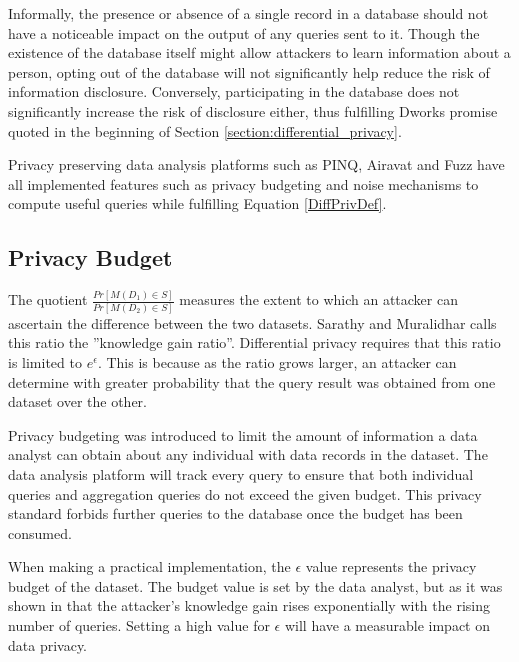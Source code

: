 Informally, the presence or absence of a single record in a database should not have a noticeable impact on the output of any queries sent to it. Though the existence of the database itself might allow attackers to learn information about a person, opting out of the database will not significantly help reduce the risk of information disclosure. Conversely, participating in the database does not significantly increase the risk of disclosure either, thus fulfilling Dworks promise quoted in the beginning of Section \ref{section:differential_privacy}.

Privacy preserving data analysis platforms such as PINQ\cite{mcsherry2009PINQ}, Airavat\cite{roy2010airavat} and Fuzz\cite{Haeberlen2011fuzz} have all implemented features such as privacy budgeting and noise mechanisms to compute useful queries while fulfilling Equation \ref{DiffPrivDef}.

\subsection{Privacy Budget}
The quotient $\frac{Pr[M(D_1)\in S]}{Pr[M(D_2)\in S]}$ measures the extent to which an attacker can ascertain the difference between the two datasets\cite{abowd2008protective}. Sarathy and Muralidhar\cite{Sarathy2011evaluating} calls this ratio the ''knowledge gain ratio''. Differential privacy requires that this ratio is limited to $e^\epsilon$. This is because as the ratio grows larger, an attacker can determine with greater probability that the query result was obtained from one dataset over the other.

Privacy budgeting was introduced to limit the amount of information a data analyst can obtain about any individual with data records in the dataset. The data analysis platform will track every query to ensure that both individual queries and aggregation queries do not exceed the given budget. This privacy standard forbids further queries to the database once the budget has been consumed. 


When making a practical implementation, the $\epsilon$ value represents the privacy budget of the dataset. The budget value is set by the data analyst, but as it was shown in \cite{Sarathy2011evaluating} that the attacker's knowledge gain rises exponentially with the rising number of queries. Setting a high value for $\epsilon$ will have a measurable impact on data privacy. 


